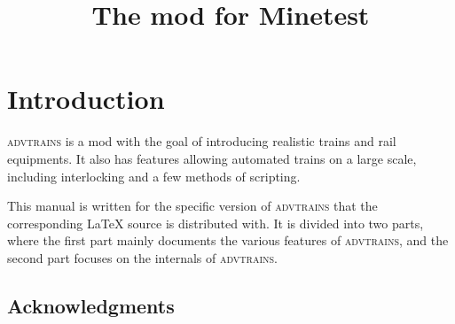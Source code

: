 \documentclass[notitlepage]{article}
\title{The \advtrains{} mod for Minetest}
\author{}
\def\advtrains{\textsc{advtrains}}
\begin{document}
\ifx\HCode\undefined
\thispagestyle{empty}
\fi

\newpage
\maketitle
\tableofcontents

\newpage
\section*{Introduction}
\advtrains{} is a mod with the goal of introducing realistic trains and rail equipments. It also has features allowing automated trains on a large scale, including interlocking and a few methods of scripting.

This manual is written for the specific version of \advtrains{} that the corresponding \LaTeX{} source is distributed with. It is divided into two parts, where the first part mainly documents the various features of \advtrains, and the second part focuses on the internals of \advtrains.

\subsection*{Acknowledgments}
\end{document}
